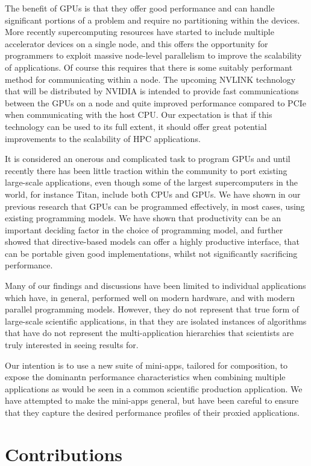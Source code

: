 \documentclass[runningheads,a4paper]{llncs}
\begin{document}
The benefit of GPUs is that they offer good performance and can handle significant portions of a problem and require no partitioning within the devices. More recently supercomputing resources have started to include multiple accelerator devices on a single node, and this offers the opportunity for programmers to exploit massive node-level parallelism to improve the scalability of applications. Of course this requires that there is some suitably performant method for communicating within a node. The upcoming NVLINK technology that will be distributed by NVIDIA is intended to provide fast communications between the GPUs on a node and quite improved performance compared to PCIe when communicating with the host CPU. Our expectation is that if this technology can be used to its full extent, it should offer great potential improvements to the scalability of HPC applications. 

It is considered an onerous and complicated task to program GPUs and until recently there has been little traction within the community to port existing large-scale applications, even though some of the largest supercomputers in the world, for instance Titan, include both CPUs and GPUs. We have shown in our previous research that GPUs can be programmed effectively, in most cases, using existing programming models. We have shown that productivity can be an important deciding factor in the choice of programming model, and further showed that directive-based models can offer a highly productive interface, that can be portable given good implementations, whilst not significantly sacrificing performance.

Many of our findings and discussions have been limited to individual applications which have, in general, performed well on modern hardware, and with modern parallel programming models. However, they do not represent that true form of large-scale scientific applications, in that they are isolated instances of algorithms that have do not represent the multi-application hierarchies that scientists are truly interested in seeing results for.

Our intention is to use a new suite of mini-apps, tailored for composition, to expose the dominantn performance characteristics when combining multiple applications as would be seen in a common scientific production application. We have attempted to make the mini-apps general, but have been careful to ensure that they capture the desired performance profiles of their proxied applications.

\section{Contributions}
\end{document}
